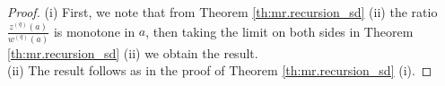 \documentclass[12pt,reqno]{amsart}
\theoremstyle{definition}
\theoremstyle{remark}
\newcommand{\wq}{w^{(q)}}
\begin{document}
\begin{proof}
(i) First, we note that from Theorem \ref{th:mr.recursion_sd} (ii) the ratio $\frac{z^{(q)}(a)}{\wq(a)}$ is monotone in $a$, then taking the limit on both sides in Theorem \ref{th:mr.recursion_sd} (ii) 
we obtain the result.\\
(ii) The result follows as in the proof of Theorem \ref{th:mr.recursion_sd} (i).
\end{proof}
\end{document}
